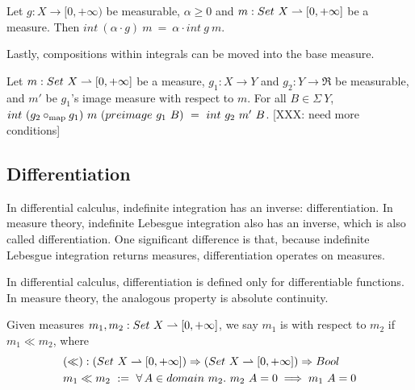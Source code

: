 \begin{lemma}
\label{lem:int-distributes-over-scaling}
Let $g : X \to [0,+\infty)$ be measurable, $\alpha \ge 0$ and $m : Set~X \rightharpoonup [0,+\infty]$ be a measure.
Then $int~(\alpha \cdot g)~m\ =\ \alpha \cdot int~g~m$.
\end{lemma}

Lastly, compositions within integrals can be moved into the base measure.

\begin{lemma}
\label{lem:int-image-measure}
Let $m : Set~X \rightharpoonup [0,+\infty]$ be a measure, $g_1 : X \to Y$ and $g_2 : Y \to \Re$ be measurable, and $m'$ be $g_1$'s image measure with respect to $m$.
For all $B \in \Sigma~Y$, $int~(g_2 \circ\map g_1)~m~(preimage~g_1~B)\ =\ int~g_2~m'~B$.
[XXX: need more conditions]
\end{lemma}

\begin{comment}
XXX: how I really want the preceeding statement:
\begin{equation}
	(int~(g_2 \circ\map g_1)~m) \circ\map (preimage_{map}~g_1)\ =\ int~g_2~(m \circ\map (preimage_{map}~g_1))
\end{equation}
\end{comment}

\subsection{Differentiation}
 
In differential calculus, indefinite integration has an inverse: differentiation.
In measure theory, indefinite Lebesgue integration also has an inverse, which is also called differentiation.
One significant difference is that, because indefinite Lebesgue integration returns measures, differentiation operates on measures.

In differential calculus, differentiation is defined only for differentiable functions.
In measure theory, the analogous property is absolute continuity.

\begin{definition}
\label{def:absolute-continuity}
Given measures $m_1,m_2 : Set~X \rightharpoonup [0,+\infty]$, we say $m_1$ is  with respect to $m_2$ if $m_1 \ll m_2$, where
\begin{equation}
\begin{aligned}
	&(\ll) : (Set~X \rightharpoonup [0,+\infty]) \Rightarrow (Set~X \rightharpoonup [0,+\infty]) \Rightarrow Bool \\
	&m_1 \ll m_2\ :=\ \forall\,{A \in domain~m_2}\ldotp\, m_2~A = 0 \implies m_1~A = 0
\end{aligned}
\end{equation}
\end{definition}

